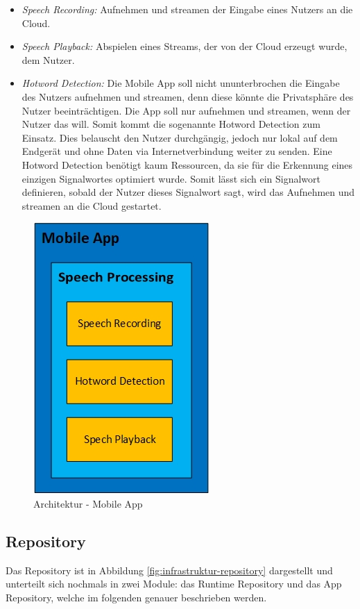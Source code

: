 \begin{itemize}
	\item \textsl{Speech Recording:} Aufnehmen und streamen der Eingabe eines Nutzers an die Cloud.
	\item \textsl{Speech Playback:} Abspielen eines Streams, der von der Cloud erzeugt wurde, dem Nutzer.
	\item \textsl{Hotword Detection:} Die Mobile App soll nicht ununterbrochen die Eingabe des Nutzers aufnehmen und streamen, denn diese könnte die Privatsphäre des Nutzer beeinträchtigen. Die App soll nur aufnehmen und streamen, wenn der Nutzer das will. Somit kommt die sogenannte \glqq Hotword Detection\grqq{} zum Einsatz. Dies belauscht den Nutzer durchgängig, jedoch nur lokal auf dem Endgerät und ohne Daten via Internetverbindung weiter zu senden. Eine Hotword Detection benötigt kaum Ressourcen, da sie für die Erkennung eines einzigen Signalwortes optimiert wurde. Somit lässt sich ein Signalwort definieren, sobald der Nutzer dieses Signalwort sagt, wird das Aufnehmen und streamen an die Cloud gestartet.
\end{itemize}

\begin{figure}[h!]
	\centering
	\includegraphics[width=0.3\linewidth]{Picture/Infrastruktur-App.jpg}
	\caption[Architektur - Mobile App]{Architektur - Mobile App}
	\label{fig:infrastruktur-app}
\end{figure}

\subsection{Repository}
Das Repository ist in Abbildung \ref{fig:infrastruktur-repository} dargestellt und unterteilt sich nochmals in zwei Module: das Runtime Repository und das App Repository, welche im folgenden genauer beschrieben werden.

